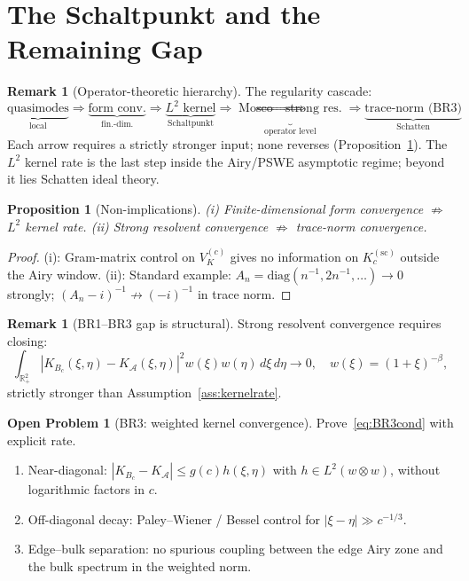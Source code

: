 \documentclass[12pt,a4paper]{amsart}
\newtheorem{proposition}[theorem]{Proposition}
\theoremstyle{definition}
\newtheorem{remark}[theorem]{Remark}
\newtheorem{problem}[theorem]{Open Problem}
\newcommand{\cA}{\mathcal{A}}
\newcommand{\R}{\mathbb{R}}
\begin{document}
\section{The Schaltpunkt and the Remaining Gap}
\label{sec:gap}

\begin{remark}[Operator-theoretic hierarchy]
\label{rem:hierarchy}
The regularity cascade:
\begin{equation}\label{eq:hierarchy}
  \underbrace{\text{quasimodes}}_{\text{local}}
  \Rightarrow
  \underbrace{\text{form conv.}}_{\text{fin.-dim.}}
  \Rightarrow
  \underbrace{L^2\text{ kernel}}_{\text{Schaltpunkt}}
  \Rightarrow
  \underbrace{\text{Mosco}\Rightarrow\text{strong res.}}_{\text{operator level}}
  \Rightarrow
  \underbrace{\text{trace-norm (BR3)}}_{\text{Schatten}}
\end{equation}
Each arrow requires a strictly stronger input;
none reverses (Proposition~\ref{prop:nonimpl}).
The $L^2$ kernel rate is the last step inside the Airy/PSWE
asymptotic regime; beyond it lies Schatten ideal theory.
\end{remark}

\begin{proposition}[Non-implications]
\label{prop:nonimpl}
(i) Finite-dimensional form convergence
$\not\Rightarrow$ $L^2$ kernel rate.
(ii) Strong resolvent convergence
$\not\Rightarrow$ trace-norm convergence.
\end{proposition}

\begin{proof}
(i): Gram-matrix control on $V_K^{(c)}$ gives no information
on $K_c^{(\mathrm{sc})}$ outside the Airy window.
(ii): Standard example:
$A_n=\mathrm{diag}(n^{-1},2n^{-1},\ldots)\to 0$ strongly;
$(A_n-i)^{-1}\not\to(-i)^{-1}$ in trace norm.
\end{proof}

\begin{remark}[BR1--BR3 gap is structural]
Strong resolvent convergence requires closing:
\begin{equation}\label{eq:BR3cond}
  \int_{\R_+^2}
  |K_{B_c}(\xi,\eta)-K_{\cA}(\xi,\eta)|^2
  w(\xi)w(\eta)\,d\xi\,d\eta \to 0,
  \quad w(\xi)=(1+\xi)^{-\beta},
\end{equation}
strictly stronger than Assumption~\ref{ass:kernelrate}.
\end{remark}

\begin{problem}[BR3: weighted kernel convergence]
\label{prob:BR3}
Prove~\eqref{eq:BR3cond} with explicit rate.
\begin{enumerate}[nosep,label=(\roman*)]
  \item Near-diagonal:
    $|K_{B_c}-K_{\cA}|\leq g(c)h(\xi,\eta)$
    with $h\in L^2(w\otimes w)$,
    without logarithmic factors in $c$.
  \item Off-diagonal decay:
    Paley--Wiener / Bessel control for $|\xi-\eta|\gg c^{-1/3}$.
  \item Edge--bulk separation:
    no spurious coupling between the edge Airy zone
    and the bulk spectrum in the weighted norm.
\end{enumerate}
\end{problem}
\end{document}
